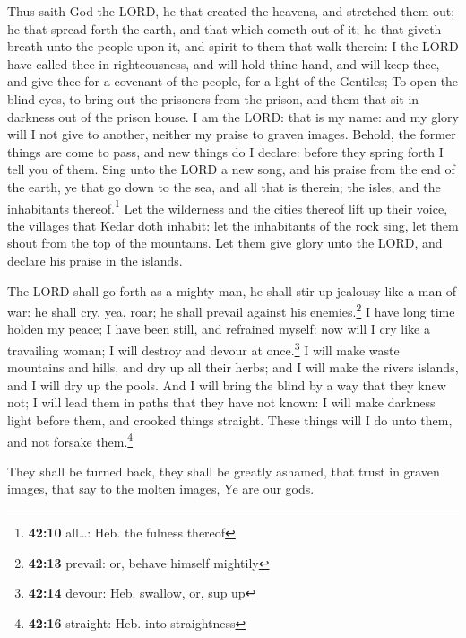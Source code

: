 Thus saith God the LORD, he that created the heavens, and
stretched them out; he that spread forth the earth, and that which
cometh out of it; he that giveth breath unto the people upon it, and
spirit to them that walk therein:  I the LORD have called
thee in righteousness, and will hold thine hand, and will keep thee, and
give thee for a covenant of the people, for a light of the Gentiles;
 To open the blind eyes, to bring out the prisoners from
the prison, and them that sit in darkness out of the prison house.
 I am the LORD: that is my name: and my glory will I not
give to another, neither my praise to graven images. 
Behold, the former things are come to pass, and new things do I declare:
before they spring forth I tell you of them.  Sing unto
the LORD a new song, and his praise from the end of the earth, ye that
go down to the sea, and all that is therein; the isles, and the
inhabitants thereof.\footnote{\textbf{42:10} all\ldots: Heb. the fulness
  thereof}  Let the wilderness and the cities thereof
lift up their voice, the villages that Kedar doth inhabit: let the
inhabitants of the rock sing, let them shout from the top of the
mountains.  Let them give glory unto the LORD, and
declare his praise in the islands.

 The LORD shall go forth as a mighty man, he shall stir
up jealousy like a man of war: he shall cry, yea, roar; he shall prevail
against his enemies.\footnote{\textbf{42:13} prevail: or, behave himself
  mightily}  I have long time holden my peace; I have
been still, and refrained myself: now will I cry like a travailing
woman; I will destroy and devour at once.\footnote{\textbf{42:14}
  devour: Heb. swallow, or, sup up}  I will make waste
mountains and hills, and dry up all their herbs; and I will make the
rivers islands, and I will dry up the pools.  And I will
bring the blind by a way that they knew not; I will lead them in paths
that they have not known: I will make darkness light before them, and
crooked things straight. These things will I do unto them, and not
forsake them.\footnote{\textbf{42:16} straight: Heb. into straightness}

 They shall be turned back, they shall be greatly
ashamed, that trust in graven images, that say to the molten images, Ye
are our gods.

